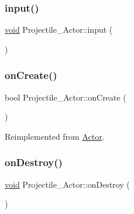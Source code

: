 \mbox{\label{classProjectile__Actor_a63aab28b99512041ebbd7474c8acb1b4}} 
\subsubsection{\texorpdfstring{input()}{input()}}
{\footnotesize\ttfamily \hyperlink{imgui__impl__opengl3__loader_8h_ac668e7cffd9e2e9cfee428b9b2f34fa7}{void} Projectile\+\_\+\+Actor\+::input (\begin{DoxyParamCaption}{ }\end{DoxyParamCaption})}

\mbox{\label{classProjectile__Actor_a98e2e2198cd164c35318c04f96e6a3ac}} 
\subsubsection{\texorpdfstring{on\+Create()}{onCreate()}}
{\footnotesize\ttfamily bool Projectile\+\_\+\+Actor\+::on\+Create (\begin{DoxyParamCaption}{ }\end{DoxyParamCaption})\hspace{0.3cm}{\ttfamily [virtual]}}



Reimplemented from \hyperlink{classActor_a56a241c949adf52cedceb45a7102ea1a}{Actor}.

\mbox{\label{classProjectile__Actor_a58d01ff77f0815ca611236f139b7aafa}} 
\subsubsection{\texorpdfstring{on\+Destroy()}{onDestroy()}}
{\footnotesize\ttfamily \hyperlink{imgui__impl__opengl3__loader_8h_ac668e7cffd9e2e9cfee428b9b2f34fa7}{void} Projectile\+\_\+\+Actor\+::on\+Destroy (\begin{DoxyParamCaption}{ }\end{DoxyParamCaption})\hspace{0.3cm}{\ttfamily [virtual]}}



